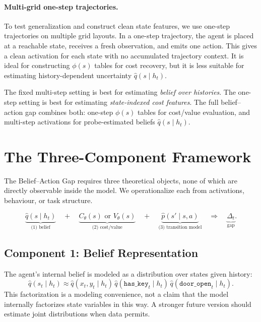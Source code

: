 \documentclass[11pt,a4paper]{article}
\newcommand{\qhat}{\hat q}
\newcommand{\phat}{\hat p}
\begin{document}
\paragraph{Multi-grid one-step trajectories.} To test generalization and construct clean state features, we use one-step trajectories on multiple grid layouts. In a one-step trajectory, the agent is placed at a reachable state, receives a fresh observation, and emits one action. This gives a clean activation for each state with no accumulated trajectory context. It is ideal for constructing $\phi(s)$ tables for cost recovery, but it is less suitable for estimating history-dependent uncertainty $\qhat(s\mid h_t)$.

\begin{analysisbox}
The fixed multi-step setting is best for estimating \emph{belief over histories}. The one-step setting is best for estimating \emph{state-indexed cost features}. The full belief--action gap combines both: one-step $\phi(s)$ tables for cost/value evaluation, and multi-step activations for probe-estimated beliefs $\qhat(s\mid h_t)$.
\end{analysisbox}

\section{The Three-Component Framework}

The Belief--Action Gap requires three theoretical objects, none of which are directly observable inside the model. We operationalize each from activations, behaviour, or task structure.

\[
\underbrace{\qhat(s\mid h_t)}_{\text{(1) belief}} \quad + \quad
\underbrace{C_\theta(s) \text{ or } V_\theta(s)}_{\text{(2) cost/value}} \quad + \quad
\underbrace{\phat(s'\mid s,a)}_{\text{(3) transition model}}
\quad \Longrightarrow \quad
\underbrace{\Delta_t}_{\text{gap}}.
\]

\subsection{Component 1: Belief Representation}

The agent's internal belief is modeled as a distribution over states given history:
\[
\qhat(s_t \mid h_t) \approx \qhat(x_t,y_t \mid h_t)\,\qhat(\texttt{has\_key}_t\mid h_t)\,\qhat(\texttt{door\_open}_t\mid h_t).
\]
This factorization is a modeling convenience, not a claim that the model internally factorizes state variables in this way. A stronger future version should estimate joint distributions when data permits.
\end{document}
